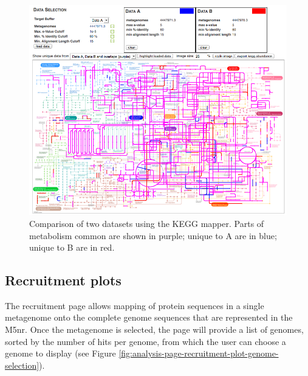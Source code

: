\documentclass[12pt,fullpage]{report}
\begin{document}
\begin{figure}[ht]
\begin{center}
\includegraphics[width=6in]{Images/analysis-page-kegg-mapper-example.png}
\end{center}
\caption{Comparison of two datasets using the KEGG mapper. Parts of metabolism common are shown in purple; unique to A are in blue; unique to B are in red.}
\label{fig:analysis-page-kegg-mapper-example}
\end{figure}
\subsection{Recruitment plots}
\label{section:recruitment-plots}

The recruitment page allows mapping of protein sequences in a single metagenome onto the complete genome sequences that are represented in the M5nr.
Once the metagenome is selected, the page will provide a list of genomes, sorted by the number of hits per genome, from which the user can choose a genome to display (see Figure \ref{fig:analysis-page-recruitment-plot-genome-selection}).
\end{document}
